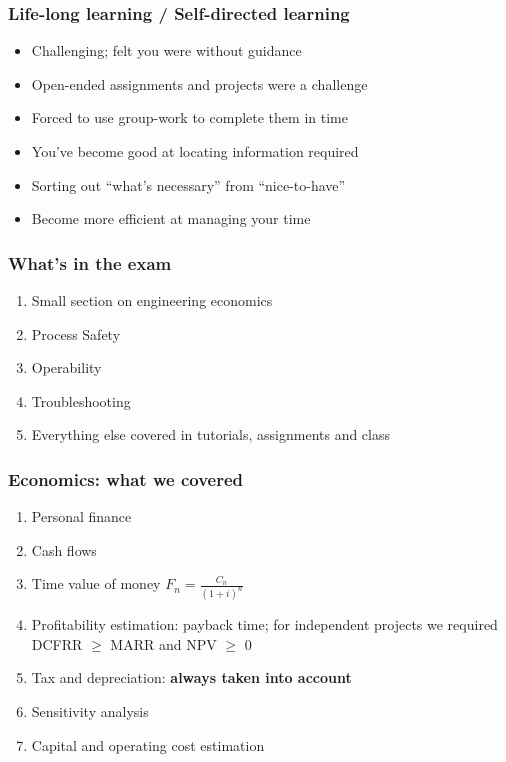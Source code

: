 \begin{frame}\frametitle{Life-long learning / Self-directed learning}
	\begin{itemize}
		\item	Challenging; felt you were without guidance
		\item	Open-ended assignments and projects were a challenge
		\item	Forced to use group-work to complete them in time
		\item	You've become good at locating information required
		\item	Sorting out ``what's necessary'' from ``nice-to-have''
		\item	Become more efficient at managing your time
	\end{itemize}
\end{frame}

\begin{frame}\frametitle{What's in the exam}
	\begin{enumerate}
		\item	Small section on engineering economics
		\item	Process Safety
		\item	Operability
		\item	Troubleshooting
		\item	Everything else covered in tutorials, assignments and class
	\end{enumerate}
\end{frame}

\begin{frame}\frametitle{Economics: what we covered}
	\begin{enumerate}
		\item	Personal finance
		\item	Cash flows
		\item	Time value of money $\displaystyle F_n = \frac{C_n}{(1+i)^n}$
		\item	Profitability estimation: payback time; for independent projects we required DCFRR $\geq$ MARR and NPV $\geq$ 0
		\item	Tax and depreciation: \textbf{always taken into account}
		\item	Sensitivity analysis
		\item	Capital and operating cost estimation
	\end{enumerate}
\end{frame}

